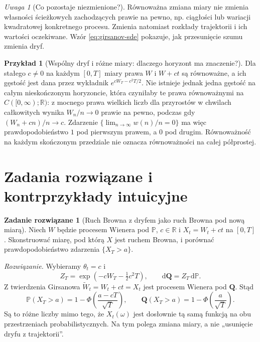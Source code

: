 \documentclass[11pt,a4paper,oneside]{report}
\numberwithin{equation}{chapter}
\theoremstyle{plain}
\theoremstyle{definition}
\newtheorem{przyklad}{Przykład}[chapter]
\newtheorem{zadanie}{Zadanie rozwiązane}[chapter]
\theoremstyle{remark}
\newtheorem{uwaga}{Uwaga}[chapter]
\newcommand{\R}{\mathbb{R}}
\newcommand{\Prob}{\mathbb{P}}
\newcommand{\dd}{\mathrm{d}}
\begin{document}
\begin{uwaga}[Co pozostaje niezmienione?]
Równoważna zmiana miary nie zmienia własności
ścieżkowych zachodzących prawie na pewno, np. ciągłości
lub wariacji kwadratowej konkretnego procesu.
Zmienia natomiast rozkłady trajektorii i ich wartości
oczekiwane. Wzór \eqref{eq:girsanov-sde} pokazuje,
jak przesunięcie szumu zmienia dryf.
\end{uwaga}

\begin{przyklad}[Wspólny dryf i różne miary: dlaczego horyzont ma znaczenie?]
Dla stałego $c\ne0$ na każdym $[0,T]$ miary prawa
$W$ i $W+ct$ są równoważne, a ich gęstość jest dana
przez wykładnik $e^{cW_T-c^2T/2}$. Nie istnieje jednak
jedna gęstość na całym nieskończonym horyzoncie,
która czyniłaby te prawa równoważnymi na
$C([0,\infty);\R)$: z mocnego prawa wielkich liczb
dla przyrostów w chwilach całkowitych wynika
$W_n/n\to0$ prawie na pewno, podczas gdy
$(W_n+cn)/n\to c$. Zdarzenie
$\{\lim_{n\to\infty}w(n)/n=0\}$ ma więc prawdopodobieństwo
$1$ pod pierwszym prawem, a $0$ pod drugim.
Równoważność na każdym skończonym przedziale nie oznacza
równoważności na całej półprostej.
\end{przyklad}

\section{Zadania rozwiązane i kontrprzykłady intuicyjne}

\begin{zadanie}[Ruch Browna z dryfem jako ruch Browna pod nową miarą]
Niech $W$ będzie procesem Wienera pod $\Prob$, $c\in\R$
i $X_t=W_t+ct$ na $[0,T]$. Skonstruować miarę,
pod którą $X$ jest ruchem Browna, i porównać
prawdopodobieństwo zdarzenia $\{X_T>a\}$.

\emph{Rozwiązanie.} Wybieramy $\theta_t=c$ i
\[
Z_T=\exp(-cW_T-\tfrac12c^2T),\qquad
\dd\mathbf Q=Z_T\,\dd\Prob.
\]
Z twierdzenia Girsanowa $\widetilde W_t=W_t+ct=X_t$
jest procesem Wienera pod $\mathbf Q$. Stąd
\[
\Prob(X_T>a)=1-\Phi\left(\frac{a-cT}{\sqrt T}\right),
\qquad
\mathbf Q(X_T>a)=1-\Phi\left(\frac a{\sqrt T}\right).
\]
Są to różne liczby mimo tego, że $X_t(\omega)$
jest dosłownie tą samą funkcją na obu przestrzeniach
probabilistycznych. Na tym polega zmiana miary, a nie
„usunięcie dryfu z trajektorii”.
\end{zadanie}
\end{document}
